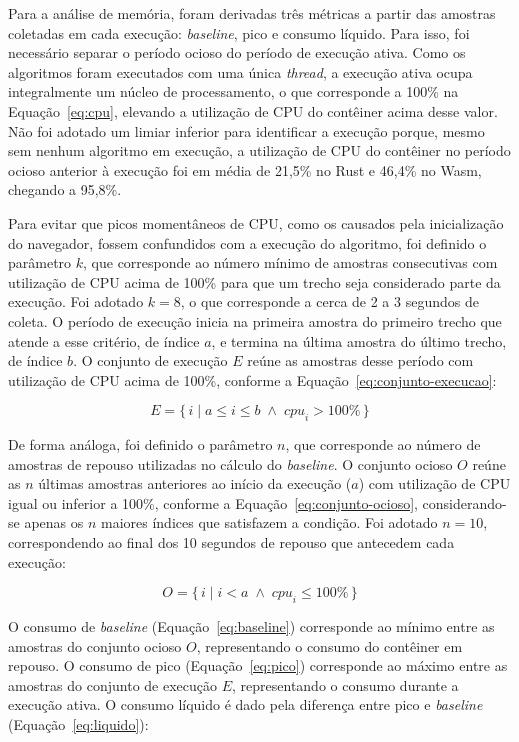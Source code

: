 Para a análise de memória, foram derivadas três métricas a partir das amostras coletadas em cada execução: \emph{baseline}, pico e consumo líquido. Para isso, foi necessário separar o período ocioso do período de execução ativa. Como os algoritmos foram executados com uma única \emph{thread}, a execução ativa ocupa integralmente um núcleo de processamento, o que corresponde a 100\% na Equação~\eqref{eq:cpu}, elevando a utilização de CPU do contêiner acima desse valor. Não foi adotado um limiar inferior para identificar a execução porque, mesmo sem nenhum algoritmo em execução, a utilização de CPU do contêiner no período ocioso anterior à execução foi em média de 21,5\% no Rust e 46,4\% no Wasm, chegando a 95,8\%.

Para evitar que picos momentâneos de CPU, como os causados pela inicialização do navegador, fossem confundidos com a execução do algoritmo, foi definido o parâmetro $k$, que corresponde ao número mínimo de amostras consecutivas com utilização de CPU acima de 100\% para que um trecho seja considerado parte da execução. Foi adotado $k = 8$, o que corresponde a cerca de 2 a 3 segundos de coleta. O período de execução inicia na primeira amostra do primeiro trecho que atende a esse critério, de índice $a$, e termina na última amostra do último trecho, de índice $b$. O conjunto de execução $E$ reúne as amostras desse período com utilização de CPU acima de 100\%, conforme a Equação~\eqref{eq:conjunto-execucao}:

\begin{equation}
\label{eq:conjunto-execucao}
E = \{\, i \mid a \leq i \leq b \;\wedge\; \mathit{cpu}_i > 100\% \,\}
\end{equation}

De forma análoga, foi definido o parâmetro $n$, que corresponde ao número de amostras de repouso utilizadas no cálculo do \emph{baseline}. O conjunto ocioso $O$ reúne as $n$ últimas amostras anteriores ao início da execução ($a$) com utilização de CPU igual ou inferior a 100\%, conforme a Equação~\eqref{eq:conjunto-ocioso}, considerando-se apenas os $n$ maiores índices que satisfazem a condição. Foi adotado $n = 10$, correspondendo ao final dos 10 segundos de repouso que antecedem cada execução:

\begin{equation}
\label{eq:conjunto-ocioso}
O = \{\, i \mid i < a \;\wedge\; \mathit{cpu}_i \leq 100\% \,\}
\end{equation}

O consumo de \emph{baseline} (Equação~\eqref{eq:baseline}) corresponde ao mínimo entre as amostras do conjunto ocioso $O$, representando o consumo do contêiner em repouso. O consumo de pico (Equação~\eqref{eq:pico}) corresponde ao máximo entre as amostras do conjunto de execução $E$, representando o consumo durante a execução ativa. O consumo líquido é dado pela diferença entre pico e \emph{baseline} (Equação~\eqref{eq:liquido}):

